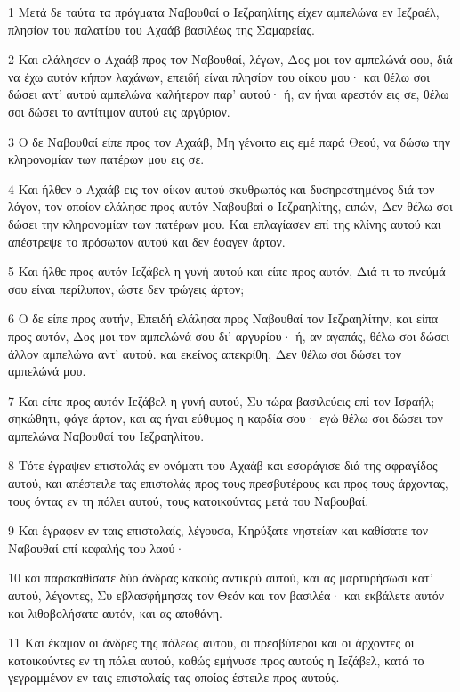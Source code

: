 \par 1 Μετά δε ταύτα τα πράγματα Ναβουθαί ο Ιεζραηλίτης είχεν αμπελώνα εν Ιεζραέλ, πλησίον του παλατίου του Αχαάβ βασιλέως της Σαμαρείας.
\par 2 Και ελάλησεν ο Αχαάβ προς τον Ναβουθαί, λέγων, Δος μοι τον αμπελώνά σου, διά να έχω αυτόν κήπον λαχάνων, επειδή είναι πλησίον του οίκου μου· και θέλω σοι δώσει αντ' αυτού αμπελώνα καλήτερον παρ' αυτού· ή, αν ήναι αρεστόν εις σε, θέλω σοι δώσει το αντίτιμον αυτού εις αργύριον.
\par 3 Ο δε Ναβουθαί είπε προς τον Αχαάβ, Μη γένοιτο εις εμέ παρά Θεού, να δώσω την κληρονομίαν των πατέρων μου εις σε.
\par 4 Και ήλθεν ο Αχαάβ εις τον οίκον αυτού σκυθρωπός και δυσηρεστημένος διά τον λόγον, τον οποίον ελάλησε προς αυτόν Ναβουβαί ο Ιεζραηλίτης, ειπών, Δεν θέλω σοι δώσει την κληρονομίαν των πατέρων μου. Και επλαγίασεν επί της κλίνης αυτού και απέστρεψε το πρόσωπον αυτού και δεν έφαγεν άρτον.
\par 5 Και ήλθε προς αυτόν Ιεζάβελ η γυνή αυτού και είπε προς αυτόν, Διά τι το πνεύμά σου είναι περίλυπον, ώστε δεν τρώγεις άρτον;
\par 6 Ο δε είπε προς αυτήν, Επειδή ελάλησα προς Ναβουθαί τον Ιεζραηλίτην, και είπα προς αυτόν, Δος μοι τον αμπελώνά σου δι' αργυρίου· ή, αν αγαπάς, θέλω σοι δώσει άλλον αμπελώνα αντ' αυτού. και εκείνος απεκρίθη, Δεν θέλω σοι δώσει τον αμπελώνά μου.
\par 7 Και είπε προς αυτόν Ιεζάβελ η γυνή αυτού, Συ τώρα βασιλεύεις επί τον Ισραήλ; σηκώθητι, φάγε άρτον, και ας ήναι εύθυμος η καρδία σου· εγώ θέλω σοι δώσει τον αμπελώνα Ναβουθαί του Ιεζραηλίτου.
\par 8 Τότε έγραψεν επιστολάς εν ονόματι του Αχαάβ και εσφράγισε διά της σφραγίδος αυτού, και απέστειλε τας επιστολάς προς τους πρεσβυτέρους και προς τους άρχοντας, τους όντας εν τη πόλει αυτού, τους κατοικούντας μετά του Ναβουβαί.
\par 9 Και έγραφεν εν ταις επιστολαίς, λέγουσα, Κηρύξατε νηστείαν και καθίσατε τον Ναβουθαί επί κεφαλής του λαού·
\par 10 και παρακαθίσατε δύο άνδρας κακούς αντικρύ αυτού, και ας μαρτυρήσωσι κατ' αυτού, λέγοντες, Συ εβλασφήμησας τον Θεόν και τον βασιλέα· και εκβάλετε αυτόν και λιθοβολήσατε αυτόν, και ας αποθάνη.
\par 11 Και έκαμον οι άνδρες της πόλεως αυτού, οι πρεσβύτεροι και οι άρχοντες οι κατοικούντες εν τη πόλει αυτού, καθώς εμήνυσε προς αυτούς η Ιεζάβελ, κατά το γεγραμμένον εν ταις επιστολαίς τας οποίας έστειλε προς αυτούς.
